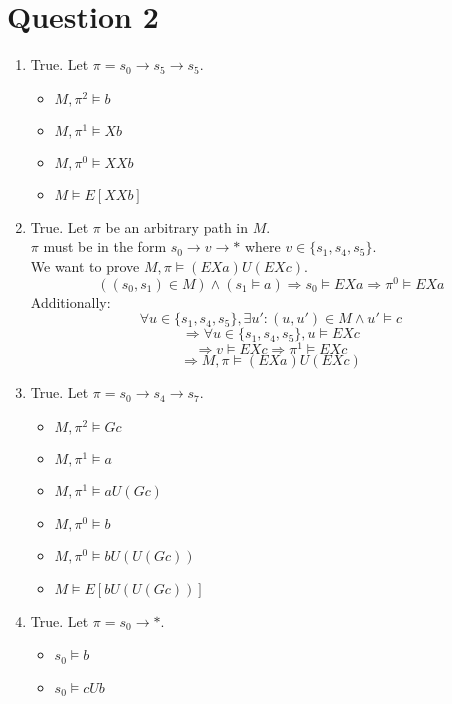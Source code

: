 \documentclass{article}
\begin{document}
\section*{Question 2}
\begin{enumerate}
    \item True. Let $\pi=s_0\rightarrow s_5\rightarrow s_5$.
        \begin{itemize}
            \item $M,\pi^2\models b$
            \item $M,\pi^1\models Xb$
            \item $M,\pi^0\models XXb$
            \item $M\models E[XXb]$
        \end{itemize}
    \item True. Let $\pi$ be an arbitrary path in $M$.\\
        $\pi$ must be in the form $s_0\rightarrow v\rightarrow *$
        where $v\in\{s_1,s_4,s_5\}$.\\
        We want to prove $M,\pi\models (EXa)U(EXc)$.\\
        \[\left((s_0,s_1)\in M\right)\wedge\left(s_1\models a\right)\Rightarrow s_0\models EXa\Rightarrow \pi^0\models EXa\]
        Additionally:
        \[\forall u\in\{s_1,s_4,s_5\}, \exists u':(u,u')\in M\wedge u'\models c\]
        \[\Rightarrow \forall u\in\{s_1,s_4,s_5\}, u\models EXc\]
        \[\Rightarrow v\models EXc\Rightarrow \pi^1\models EXc\]
        \[\Rightarrow M,\pi\models (EXa)U(EXc)\]
    \item True. Let $\pi=s_0\rightarrow s_4\rightarrow s_7$.
        \begin{itemize}
            \item $M,\pi^2\models Gc$
            \item $M,\pi^1\models a$
            \item $M,\pi^1\models aU(Gc)$
            \item $M,\pi^0\models b$
            \item $M,\pi^0\models bU(U(Gc))$
            \item $M\models E[bU(U(Gc))]$
        \end{itemize}
    \item True. Let $\pi=s_0\rightarrow *$.\\
        \begin{itemize}
            \item $s_0\models b$
            \item $s_0\models cUb$

\end{itemize}
\end{enumerate}
\end{document}
